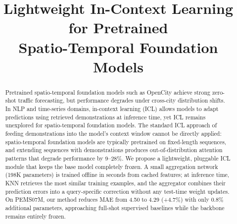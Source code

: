 \documentclass[conference]{IEEEtran}
\begin{document}
\title{Lightweight In-Context Learning for Pretrained\\Spatio-Temporal Foundation Models}

\author{
\and
{}
\and
{}
}

\maketitle

\begin{abstract}
Pretrained spatio-temporal foundation models such as OpenCity achieve strong zero-shot traffic forecasting, but performance degrades under cross-city distribution shifts.
In NLP and time-series domains, in-context learning (ICL) allows models to adapt predictions using retrieved demonstrations at inference time, yet ICL remains unexplored for spatio-temporal foundation models.
The standard ICL approach of feeding demonstrations into the model's context window cannot be directly applied: spatio-temporal foundation models are typically pretrained on fixed-length sequences, and extending sequences with demonstrations produces out-of-distribution attention patterns that degrade performance by 9--28\%.
We propose a lightweight, pluggable ICL module that keeps the base model completely frozen.
A small aggregation network (198K parameters) is trained offline in seconds from cached features; at inference time, KNN retrieves the most similar training examples, and the aggregator combines their prediction errors into a query-specific correction without any test-time weight updates.
On PEMS07M, our method reduces MAE from 4.50 to 4.29 (+4.7\%) with only 0.8\% additional parameters, approaching full-shot supervised baselines while the backbone remains entirely frozen.
\end{abstract}
\end{document}
